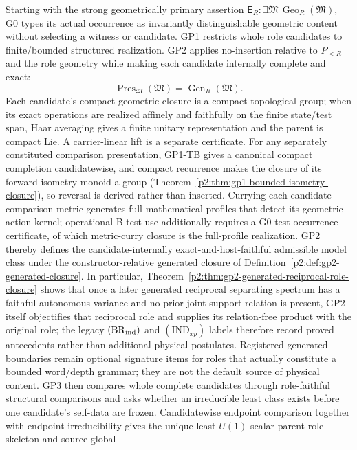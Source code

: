 \documentclass[12pt,a4paper]{article}
\begin{document}
Starting with the strong geometrically primary assertion
\(\mathsf E_R:\exists\mathfrak M\,\operatorname{Geo}_R(\mathfrak M)\), G0
types its actual occurrence as invariantly distinguishable geometric content
without selecting a witness or candidate.  GP1
restricts whole role candidates to finite/bounded structured realization.  GP2
applies no-insertion relative to \(P_{<R}\) and the role geometry while making
each candidate internally complete and exact:
\[
 \operatorname{Pres}_{\mathfrak M}(\mathfrak M)
 =\operatorname{Gen}_R(\mathfrak M).
\]
Each candidate's compact geometric closure is a compact topological group;
when its exact operations are realized affinely and faithfully on the finite
state/test span, Haar averaging gives a finite unitary representation and
the parent is compact Lie.  A carrier-linear lift is a separate certificate.  For any separately constituted comparison
presentation, GP1-TB gives a canonical compact completion candidatewise, and
compact recurrence makes the closure of its forward isometry monoid a group
(Theorem~\ref{p2:thm:gp1-bounded-isometry-closure}), so reversal is derived
rather than inserted.  Currying each candidate comparison metric generates full
mathematical profiles that detect its geometric action kernel; operational
B-test use additionally requires a G0 test-occurrence certificate, of which
metric-curry closure is the full-profile realization.
GP2 thereby defines the candidate-internally exact-and-host-faithful admissible
model class under the constructor-relative generated closure of
Definition~\ref{p2:def:gp2-generated-closure}.  In particular,
Theorem~\ref{p2:thm:gp2-generated-reciprocal-role-closure} shows that once a
later generated reciprocal separating spectrum has a faithful autonomous
variance and no prior joint-support relation is present, GP2 itself
objectifies that reciprocal role and supplies its relation-free product with
the original role; the legacy \((\mathrm{BR}_{\rm ind})\) and
\((\mathrm{IND}_{xp})\) labels therefore record proved antecedents rather
than additional physical postulates.  Registered generated boundaries remain
optional signature items for roles that actually constitute a bounded
word/depth grammar; they are not the default source of physical content.  GP3
then compares whole complete candidates through role-faithful structural
comparisons and asks whether an irreducible least class exists before one
candidate's self-data are frozen.
Candidatewise endpoint comparison together with endpoint irreducibility gives
the unique least \(U(1)\) scalar parent-role skeleton and source-global
\end{document}
